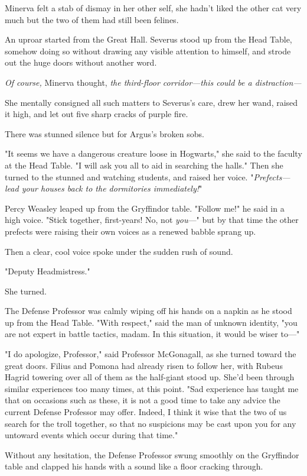 Minerva felt a stab of dismay in her other self, she hadn't liked the other cat
very much but the two of them had still been felines.

An uproar started from the Great Hall. Severus stood up from the Head Table,
somehow doing so without drawing any visible attention to himself, and strode
out the huge doors without another word.

\emph{Of course,} Minerva thought, \emph{the third-floor corridor—this could
be a distraction—}

She mentally consigned all such matters to Severus's care, drew her wand,
raised it high, and let out five sharp cracks of purple fire.

There was stunned silence but for Argus's broken sobs.

"It seems we have a dangerous creature loose in Hogwarts," she said to the
faculty at the Head Table. "I will ask you all to aid in searching the halls."
Then she turned to the stunned and watching students, and raised her voice.
"\emph{Prefects—lead your houses back to the dormitories immediately!}"

Percy Weasley leaped up from the Gryffindor table. "Follow me!" he said in a
high voice. "Stick together, first-years! No, not \emph{you}—" but by that
time the other prefects were raising their own voices as a renewed babble
sprang up.

Then a clear, cool voice spoke under the sudden rush of sound.

"Deputy Headmistress."

She turned.

The Defense Professor was calmly wiping off his hands on a napkin as he stood
up from the Head Table. "With respect," said the man of unknown identity, "you
are not expert in battle tactics, madam. In this situation, it would be wiser
to—"

"I do apologize, Professor," said Professor McGonagall, as she turned toward
the great doors. Filius and Pomona had already risen to follow her, with Rubeus
Hagrid towering over all of them as the half-giant stood up. She'd been through
similar experiences too many times, at this point. "Sad experience has taught
me that on occasions such as these, it is not a good time to take any advice
the current Defense Professor may offer. Indeed, I think it wise that the two
of us search for the troll together, so that no suspicions may be cast upon you
for any untoward events which occur during that time."

Without any hesitation, the Defense Professor swung smoothly on the Gryffindor
table and clapped his hands with a sound like a floor cracking through.

